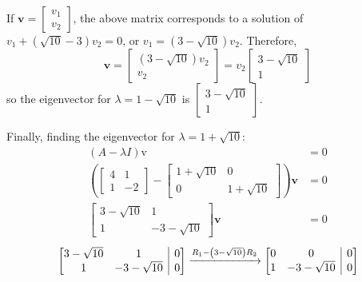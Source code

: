 \documentclass[11pt]{article}
\makeatletter
\newenvironment{amatrix}[1]{%
    \left[\begin{array}{@{}*{#1}{c}|c@{}}
}{%
    \end{array}\right]
}
\makeatother
\begin{document}
\begin{enumerate}[label=\textbf{\arabic*.}, start=3]
{\begin{enumerate}[label=\textbf{(\alph*)}]
{\begin{equation*}
                    \end{equation*}
                    If \(\mathbf{v}=\begin{bmatrix}v_1 \\ v_2\end{bmatrix}\), the above matrix corresponds to a solution of \(v_1+\left(\sqrt{10}-3\right)v_2=0\), or \(v_1=\left(3-\sqrt{10}\right)v_2\). Therefore,
                    \[\mathbf{v}=\begin{bmatrix}\left(3-\sqrt{10}\right)v_2 \\ v_2\end{bmatrix}=v_2\begin{bmatrix}3-\sqrt{10} \\ 1\end{bmatrix}\]
                    so the eigenvector for \(\lambda=1-\sqrt{10}\) is \(\begin{bmatrix}3-\sqrt{10} \\ 1\end{bmatrix}\).
                    \par
                    Finally, finding the eigenvector for \(\lambda=1+\sqrt{10}\):
                    \begin{align*}
                        (A-\lambda I)\mathrm{v}&=0 \\
                        \left(\begin{bmatrix}4 & 1 \\ 1 & -2\end{bmatrix}-\begin{bmatrix}1+\sqrt{10} & 0 \\ 0 & 1+\sqrt{10}\end{bmatrix}\right)\mathbf{v}&=0 \\
                        \begin{bmatrix}3-\sqrt{10} & 1 \\ 1 & -3-\sqrt{10}\end{bmatrix}\mathbf{v}&=0
                    \end{align*}
                    \begin{equation*}
                        \begin{amatrix}{2}3-\sqrt{10} & 1 & 0 \\ 1 & -3-\sqrt{10} & 0\end{amatrix}
                        \xrightarrow{R_1-\left(3-\sqrt{10}\right)R_2}
                        \begin{amatrix}{2}0 & 0 & 0 \\ 1 & -3-\sqrt{10} & 0\end{amatrix}

\end{equation*}}
\end{enumerate}}
\end{enumerate}
\end{document}
